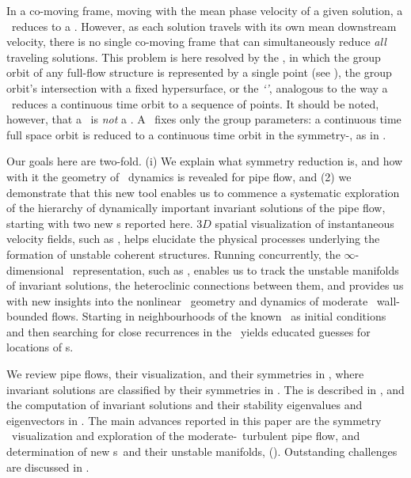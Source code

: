\documentclass{jfm}
\begin{document}
In a co-moving frame, moving with the mean phase velocity of a given
solution, a \rpo\ reduces to a \po.
However, as each solution travels with its own mean downstream velocity,
there is no single co-moving frame that can simultaneously reduce
\emph{all} traveling solutions.
This problem is here resolved by the
{\mslices}, in
which the group orbit of any full-flow structure is represented by a
single point (see ), the group orbit's intersection
with a fixed hypersurface, or the \emph{`\slice'}, analogous to the way a
\PoincSec\ reduces a continuous time orbit to a sequence of points. It
should be noted, however, that a \slice\ is \emph{not} a \PoincSec. A
\slice\ fixes only the group parameters: a continuous time full space
orbit is reduced to a continuous time orbit in the symmetry-\reducedsp,
as in .

Our goals here are two-fold.
(i) We explain what symmetry reduction is, and how with it the geometry
of \statesp\ dynamics is revealed for pipe flow, and
(2) we demonstrate that this new tool enables us to commence a systematic
exploration of the hierarchy of dynamically important invariant solutions
of the pipe flow, starting with two new \rpo s reported here. $3D$
spatial visualization of instantaneous velocity fields,
such as , helps elucidate
the physical processes underlying the formation of unstable coherent
structures. Running concurrently, the $\infty$-dimensional \stateDsp\
representation, such as ,
enables us to track the unstable manifolds of invariant
solutions, the heteroclinic connections between them, and
{provides us with} new insights into the nonlinear \statesp\ geometry and
dynamics of moderate \Reynolds\ wall-bounded flows. Starting in
neighbourhoods of the known \reqva\
 as initial conditions and then searching for
close {recurrences} in the \reducedsp\ yields
educated guesses for locations of \rpo s.

We review  pipe flows, their visualization,
and their symmetries in , where
invariant solutions are classified by their symmetries in
\refappe{appe:DiscSymmPipe}.
The {\mslices}  is described in \refsect{s:slice},
and the computation of invariant solutions and their stability
eigenvalues and eigenvectors in . The
main advances reported in this paper are the symmetry \reducedsp\
visualization and exploration of the moderate-\Reynolds\ turbulent pipe
flow, and determination of new \rpo s\ and their unstable manifolds,
(\refsect{s:rpos}). Outstanding challenges are discussed in
\refsect{s:concl}.
\end{document}
